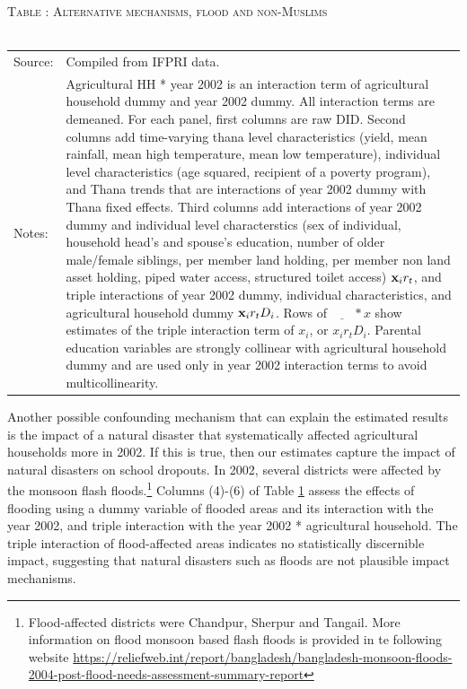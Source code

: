 \documentclass[12pt,letterpaper]{article}
\newcommand{\bfx}{\ensuremath{\mbox{\bf x}}}
\newcommand{\0}{\ensuremath{\mbox{\boldmath $0$}}}
\begin{document}
\begin{table}\hfil\textsc{\footnotesize Table \thetable: Alternative mechanisms, flood and non-Muslims\label{FloodNonMuslimResultsConcise}}\\\setlength{\tabcolsep}{.5pt}\renewcommand{\arraystretch}{.675}\hspace{-2em}\hfil\\\renewcommand{\arraystretch}{1}\hfil\begin{tabular}{>{\hfill\scriptsize}p{1cm}<{}>{\scriptsize}p{12cm}<{\hfill}} Source:& Compiled from IFPRI data. \\[-1ex] Notes:&   \textsf{Agricultural HH * year 2002} is an interaction term of agricultural household dummy and year 2002 dummy. All interaction terms are demeaned. For each panel, first columns are raw DID. Second columns add time-varying thana level characteristics (yield, mean rainfall, mean high temperature, mean low temperature), individual level characteristics (age squared, recipient of a poverty program), and \textsf{Thana trends} that are interactions of year 2002 dummy with Thana fixed effects. Third columns add interactions of year 2002 dummy and individual level characterstics (sex of individual, household head's and spouse's education, number of older male/female siblings, per member land holding, per member non land asset holding, piped water access, structured toilet access) $\bfx_{i}r_{t}$, and triple interactions of year 2002 dummy, individual characteristics, and agricultural household dummy $\bfx_{i}r_{t}D_{i}$. Rows of $\underline{\phantom{mm}}*x$ show estimates of the triple interaction term of $x_{i}$, or $x_{i}r_{t}D_{i}$. Parental education variables are strongly collinear with agricultural household dummy and are used only in year 2002 interaction terms to avoid multicollinearity.   \end{tabular} \end{table}


Another possible confounding mechanism that can explain the estimated results is the impact of a natural disaster that systematically affected agricultural households more in 2002. If this is true, then our estimates capture the impact of natural disasters on school dropouts. In 2002, several districts were affected by the monsoon flash floods.\footnote{Flood-affected districts were Chandpur, Sherpur and Tangail. More information on flood monsoon based flash floods is provided in te following website \url{https://reliefweb.int/report/bangladesh/bangladesh-monsoon-floods-2004-post-flood-needs-assessment-summary-report} } Columns (4)-(6) of Table \ref{FloodNonMuslimResultsConcise} assess the effects of flooding using a dummy variable of flooded areas and its interaction with the year 2002, and triple interaction with the year 2002 * agricultural household. The triple interaction of flood-affected areas indicates no statistically discernible impact, suggesting that natural disasters such as floods are not plausible impact mechanisms.
\end{document}
